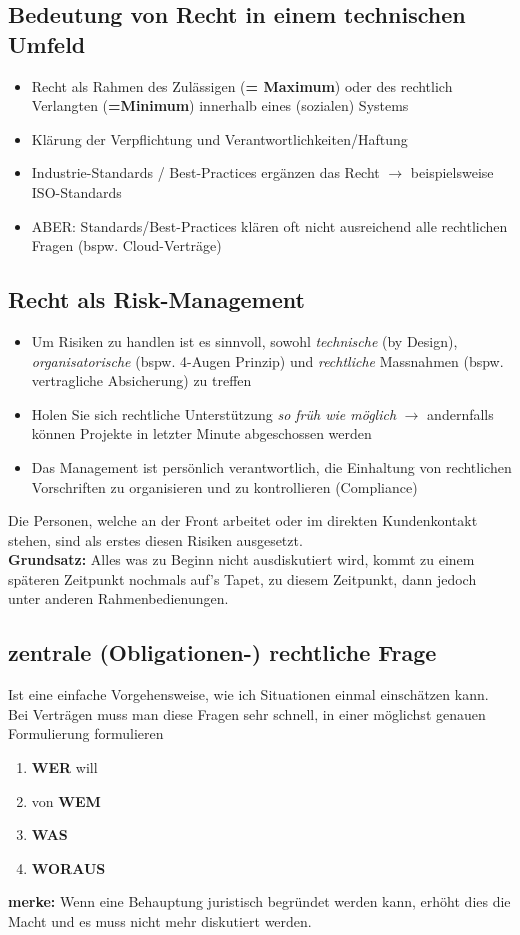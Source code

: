 \documentclass{report}
\theoremstyle{definition}
\theoremstyle{example}
\begin{document}
\subsection{Bedeutung von Recht in einem technischen Umfeld}
\begin{itemize}
   \item Recht als Rahmen des Zulässigen (\textbf{= Maximum}) oder des rechtlich Verlangten (\textbf{=Minimum}) innerhalb eines (sozialen) Systems
   \item Klärung der Verpflichtung und Verantwortlichkeiten/Haftung
   \item Industrie-Standards / Best-Practices ergänzen das Recht $\rightarrow$ beispielsweise ISO-Standards
   \item ABER: Standards/Best-Practices klären oft nicht ausreichend alle rechtlichen Fragen (bspw. Cloud-Verträge)
\end{itemize}

\subsection{Recht als Risk-Management}
\begin{itemize}
   \item Um Risiken zu handlen ist es sinnvoll, sowohl \textit{technische} (by Design), \textit{organisatorische} (bspw. 4-Augen Prinzip) und \textit{rechtliche} Massnahmen (bspw. vertragliche Absicherung) zu treffen
   \item Holen Sie sich rechtliche Unterstützung \textit{so früh wie möglich} $\rightarrow$ andernfalls können Projekte in letzter Minute abgeschossen werden
   \item Das Management ist persönlich verantwortlich, die Einhaltung von rechtlichen Vorschriften zu organisieren und zu kontrollieren (Compliance)
\end{itemize}
Die Personen, welche an der Front arbeitet oder im direkten Kundenkontakt stehen, sind als erstes diesen Risiken ausgesetzt.\\
\textbf{Grundsatz:} Alles was zu Beginn nicht ausdiskutiert wird, kommt zu einem späteren Zeitpunkt nochmals auf's Tapet, zu diesem Zeitpunkt, dann jedoch unter anderen Rahmenbedienungen.

\subsection{zentrale (Obligationen-) rechtliche Frage}
Ist eine einfache Vorgehensweise, wie ich Situationen einmal einschätzen kann.\\
Bei Verträgen muss man diese Fragen sehr schnell, in einer möglichst genauen Formulierung formulieren 
\begin{enumerate}
   \item \textbf{WER} will
   \item von \textbf{WEM}
   \item \textbf{WAS}
   \item \textbf{WORAUS}
\end{enumerate}
\textbf{merke:} Wenn eine Behauptung juristisch begründet werden kann, erhöht dies die Macht und es muss nicht mehr diskutiert werden.
\end{document}
